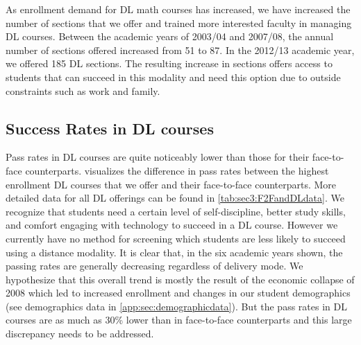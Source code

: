 As enrollment demand for DL math courses has increased, we have increased the
number of sections that we offer and trained more interested faculty in managing
DL courses.  Between the academic years of 2003/04 and 2007/08, the annual
number of sections offered increased from 51 to 87.  In the 2012/13 academic
year, we offered 185 DL sections.   The resulting increase in sections offers
access to students that can succeed in this modality and need this option due to
outside constraints such as work and family.


\subsection{Success Rates in DL courses}
Pass rates in DL courses are quite noticeably lower than those for their
face-to-face counterparts.  visualizes the
difference in pass rates between the highest enrollment DL courses that we offer
and their face-to-face counterparts. More detailed data for all DL offerings can
be found in \cref{tab:sec3:F2FandDLdata}. We recognize that students need a
certain level of self-discipline, better study skills, and comfort engaging with
technology to succeed in a DL course. However we currently have no method for
screening which students are less likely to succeed using a distance modality.
It is clear that, in the six academic years shown, the passing rates are
generally decreasing regardless of delivery mode.  We hypothesize that this
overall trend is mostly the result of the economic collapse of 2008 which led to
increased enrollment and changes in our student demographics (see demographics
data in \vref{app:sec:demographicdata}).  But the pass rates in DL courses are
as much as 30\% lower than in face-to-face counterparts and this large
discrepancy needs to be addressed.

